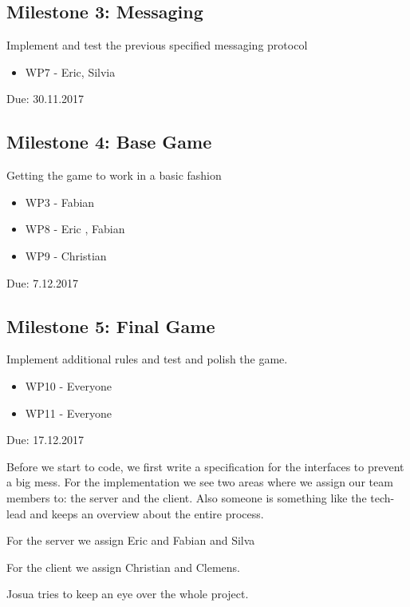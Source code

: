 \documentclass{sig-alternate}
\begin{document}
\subsection{Milestone 3: Messaging}
Implement and test the previous specified messaging protocol
\begin{itemize}
	\item WP7 - Eric, Silvia
\end{itemize}
Due: 30.11.2017

\subsection{Milestone 4: Base Game}
Getting the game to work in a basic fashion
\begin{itemize}
	\item WP3 - Fabian
	\item WP8 - Eric , Fabian
	\item WP9 - Christian
\end{itemize}
Due: 7.12.2017

\subsection{Milestone 5: Final Game}
Implement additional rules and test and polish the game.
\begin{itemize}
	\item WP10 - Everyone
	\item WP11 - Everyone
\end{itemize}
Due: 17.12.2017

Before we start to code, we first write a specification for the interfaces to prevent a big mess. For the implementation we see two areas where we assign our team members to: the server and the client. Also someone is something like the tech-lead and keeps an overview about the entire process.

For the server we assign Eric and Fabian and Silva

For the client we assign Christian and Clemens.

Josua tries to keep an eye over the whole project.





\end{document}
